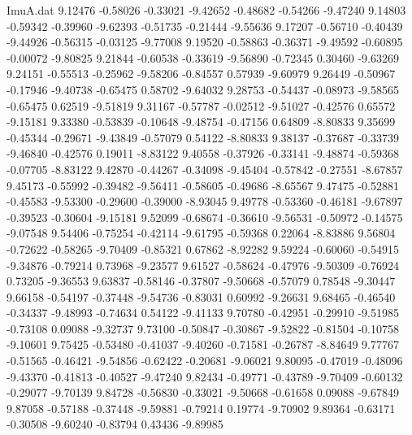 \begin{filecontents}{ImuA.dat}
   9.12476   -0.58026   -0.33021   -9.42652   -0.48682   -0.54266   -9.47240
   9.14803   -0.59342   -0.39960   -9.62393   -0.51735   -0.21444   -9.55636
   9.17207   -0.56710   -0.40439   -9.44926   -0.56315   -0.03125   -9.77008
   9.19520   -0.58863   -0.36371   -9.49592   -0.60895   -0.00072   -9.80825
   9.21844   -0.60538   -0.33619   -9.56890   -0.72345    0.30460   -9.63269
   9.24151   -0.55513   -0.25962   -9.58206   -0.84557    0.57939   -9.60979
   9.26449   -0.50967   -0.17946   -9.40738   -0.65475    0.58702   -9.64032
   9.28753   -0.54437   -0.08973   -9.58565   -0.65475    0.62519   -9.51819
   9.31167   -0.57787   -0.02512   -9.51027   -0.42576    0.65572   -9.15181
   9.33380   -0.53839   -0.10648   -9.48754   -0.47156    0.64809   -8.80833
   9.35699   -0.45344   -0.29671   -9.43849   -0.57079    0.54122   -8.80833
   9.38137   -0.37687   -0.33739   -9.46840   -0.42576    0.19011   -8.83122
   9.40558   -0.37926   -0.33141   -9.48874   -0.59368   -0.07705   -8.83122
   9.42870   -0.44267   -0.34098   -9.45404   -0.57842   -0.27551   -8.67857
   9.45173   -0.55992   -0.39482   -9.56411   -0.58605   -0.49686   -8.65567
   9.47475   -0.52881   -0.45583   -9.53300   -0.29600   -0.39000   -8.93045
   9.49778   -0.53360   -0.46181   -9.67897   -0.39523   -0.30604   -9.15181
   9.52099   -0.68674   -0.36610   -9.56531   -0.50972   -0.14575   -9.07548
   9.54406   -0.75254   -0.42114   -9.61795   -0.59368    0.22064   -8.83886
   9.56804   -0.72622   -0.58265   -9.70409   -0.85321    0.67862   -8.92282
   9.59224   -0.60060   -0.54915   -9.34876   -0.79214    0.73968   -9.23577
   9.61527   -0.58624   -0.47976   -9.50309   -0.76924    0.73205   -9.36553
   9.63837   -0.58146   -0.37807   -9.50668   -0.57079    0.78548   -9.30447
   9.66158   -0.54197   -0.37448   -9.54736   -0.83031    0.60992   -9.26631
   9.68465   -0.46540   -0.34337   -9.48993   -0.74634    0.54122   -9.41133
   9.70780   -0.42951   -0.29910   -9.51985   -0.73108    0.09088   -9.32737
   9.73100   -0.50847   -0.30867   -9.52822   -0.81504   -0.10758   -9.10601
   9.75425   -0.53480   -0.41037   -9.40260   -0.71581   -0.26787   -8.84649
   9.77767   -0.51565   -0.46421   -9.54856   -0.62422   -0.20681   -9.06021
   9.80095   -0.47019   -0.48096   -9.43370   -0.41813   -0.40527   -9.47240
   9.82434   -0.49771   -0.43789   -9.70409   -0.60132   -0.29077   -9.70139
   9.84728   -0.56830   -0.33021   -9.50668   -0.61658    0.09088   -9.67849
   9.87058   -0.57188   -0.37448   -9.59881   -0.79214    0.19774   -9.70902
   9.89364   -0.63171   -0.30508   -9.60240   -0.83794    0.43436   -9.89985

\end{filecontents}
